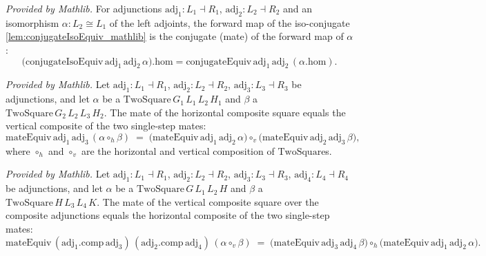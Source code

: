 \begin{lemma}
  \label{lem:conjugateIsoEquiv_apply_hom_mathlib}
  \mathlibok
  \textit{Provided by Mathlib.}
  For adjunctions \(\mathrm{adj}_1 : L_1 \dashv R_1\), \(\mathrm{adj}_2 : L_2 \dashv R_2\) and an
  isomorphism \(\alpha : L_2 \cong L_1\) of the left adjoints, the forward map of the iso-conjugate
  \cref{lem:conjugateIsoEquiv_mathlib} is the conjugate (mate) of the forward map of \(\alpha\):
  \[
    \bigl(\mathrm{conjugateIsoEquiv}\,\mathrm{adj}_1\,\mathrm{adj}_2\,\alpha\bigr).\mathrm{hom}
      = \mathrm{conjugateEquiv}\,\mathrm{adj}_1\,\mathrm{adj}_2\,(\alpha.\mathrm{hom}).
  \]
\end{lemma}

\begin{lemma}
  \label{lem:mateEquiv_vcomp_mathlib}
  \mathlibok
  \textit{Provided by Mathlib.}
  Let \(\mathrm{adj}_1 : L_1 \dashv R_1\), \(\mathrm{adj}_2 : L_2 \dashv R_2\),
  \(\mathrm{adj}_3 : L_3 \dashv R_3\) be adjunctions, and let \(\alpha\) be a
  \(\mathrm{TwoSquare}\,G_1\,L_1\,L_2\,H_1\) and \(\beta\) a
  \(\mathrm{TwoSquare}\,G_2\,L_2\,L_3\,H_2\). The mate of the horizontal composite square
  equals the vertical composite of the two single-step mates:
  \[
    \mathrm{mateEquiv}\,\mathrm{adj}_1\,\mathrm{adj}_3\,(\alpha \mathbin{\circ_h} \beta)
      \;=\;
    \bigl(\mathrm{mateEquiv}\,\mathrm{adj}_1\,\mathrm{adj}_2\,\alpha\bigr)
      \mathbin{\circ_v}
    \bigl(\mathrm{mateEquiv}\,\mathrm{adj}_2\,\mathrm{adj}_3\,\beta\bigr),
  \]
  where \(\mathbin{\circ_h}\) and \(\mathbin{\circ_v}\) are the horizontal and vertical
  composition of \(\mathrm{TwoSquare}\)s.
\end{lemma}

\begin{lemma}
  \label{lem:mateEquiv_hcomp_mathlib}
  \mathlibok
  \textit{Provided by Mathlib.}
  Let \(\mathrm{adj}_1 : L_1 \dashv R_1\), \(\mathrm{adj}_2 : L_2 \dashv R_2\),
  \(\mathrm{adj}_3 : L_3 \dashv R_3\), \(\mathrm{adj}_4 : L_4 \dashv R_4\) be adjunctions, and
  let \(\alpha\) be a \(\mathrm{TwoSquare}\,G\,L_1\,L_2\,H\) and \(\beta\) a
  \(\mathrm{TwoSquare}\,H\,L_3\,L_4\,K\). The mate of the vertical composite square over the
  composite adjunctions equals the horizontal composite of the two single-step mates:
  \[
    \mathrm{mateEquiv}\,(\mathrm{adj}_1.\mathrm{comp}\,\mathrm{adj}_3)\,
      (\mathrm{adj}_2.\mathrm{comp}\,\mathrm{adj}_4)\,(\alpha \mathbin{\circ_v} \beta)
      \;=\;
    \bigl(\mathrm{mateEquiv}\,\mathrm{adj}_3\,\mathrm{adj}_4\,\beta\bigr)
      \mathbin{\circ_h}
    \bigl(\mathrm{mateEquiv}\,\mathrm{adj}_1\,\mathrm{adj}_2\,\alpha\bigr).
  \]
\end{lemma}

